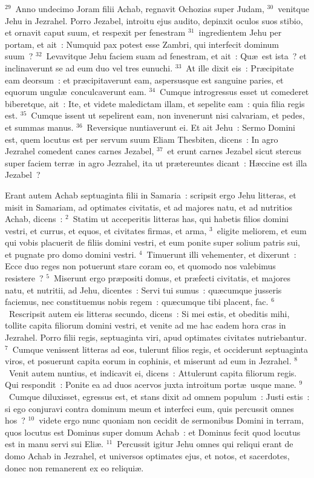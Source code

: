 ${}^{29}$~Anno undecimo Joram filii Achab, regnavit Ochozias super Judam,
${}^{30}$~venitque Jehu in Jezrahel. Porro Jezabel, introitu ejus audito, depinxit oculos suos stibio, et ornavit caput suum, et respexit per fenestram
${}^{31}$~ingredientem Jehu per portam, et ait~: Numquid pax potest esse Zambri, qui interfecit dominum suum~?
${}^{32}$~Levavitque Jehu faciem suam ad fenestram, et ait~: Qu\ae\ est ista~? et inclinaverunt se ad eum duo vel tres eunuchi.
${}^{33}$~At ille dixit eis~: Pr\ae cipitate eam deorsum~: et pr\ae cipitaverunt eam, aspersusque est sanguine paries, et equorum ungul\ae\ conculcaverunt eam.
${}^{34}$~Cumque introgressus esset ut comederet biberetque, ait~: Ite, et videte maledictam illam, et sepelite eam~: quia filia regis est.
${}^{35}$~Cumque issent ut sepelirent eam, non invenerunt nisi calvariam, et pedes, et summas manus.
${}^{36}$~Reversique nuntiaverunt ei. Et ait Jehu~: Sermo Domini est, quem locutus est per servum suum Eliam Thesbiten, dicens~: In agro Jezrahel comedent canes carnes Jezabel,
${}^{37}$~et erunt carnes Jezabel sicut stercus super faciem terr\ae\ in agro Jezrahel, ita ut pr\ae tereuntes dicant~: H\ae ccine est illa Jezabel~?

\bchapter
\lettrine[lines=3,image=true,loversize=0.05,lraise=-0.03]{E}{}rant autem Achab septuaginta filii in Samaria~: scripsit ergo Jehu litteras, et misit in Samariam, ad optimates civitatis, et ad majores natu, et ad nutritios Achab, dicens~:
${}^{2}$~Statim ut acceperitis litteras has, qui habetis filios domini vestri, et currus, et equos, et civitates firmas, et arma,
${}^{3}$~eligite meliorem, et eum qui vobis placuerit de filiis domini vestri, et eum ponite super solium patris sui, et pugnate pro domo domini vestri.
${}^{4}$~Timuerunt illi vehementer, et dixerunt~: Ecce duo reges non potuerunt stare coram eo, et quomodo nos valebimus resistere~?
${}^{5}$~Miserunt ergo pr\ae positi domus, et pr\ae fecti civitatis, et majores natu, et nutritii, ad Jehu, dicentes~: Servi tui sumus~: qu\ae cumque jusseris faciemus, nec constituemus nobis regem~: qu\ae cumque tibi placent, fac.
${}^{6}$~Rescripsit autem eis litteras secundo, dicens~: Si mei estis, et obeditis mihi, tollite capita filiorum domini vestri, et venite ad me hac eadem hora cras in Jezrahel. Porro filii regis, septuaginta viri, apud optimates civitates nutriebantur.
${}^{7}$~Cumque venissent litteras ad eos, tulerunt filios regis, et occiderunt septuaginta viros, et posuerunt capita eorum in cophinis, et miserunt ad eum in Jezrahel.
${}^{8}$~Venit autem nuntius, et indicavit ei, dicens~: Attulerunt capita filiorum regis. Qui respondit~: Ponite ea ad duos acervos juxta introitum port\ae\ usque mane.
${}^{9}$~Cumque diluxisset, egressus est, et stans dixit ad omnem populum~: Justi estis~: si ego conjuravi contra dominum meum et interfeci eum, quis percussit omnes hos~?
${}^{10}$~videte ergo nunc quoniam non cecidit de sermonibus Domini in terram, quos locutus est Dominus super domum Achab~: et Dominus fecit quod locutus est in manu servi sui Eli\ae .
${}^{11}$~Percussit igitur Jehu omnes qui reliqui erant de domo Achab in Jezrahel, et universos optimates ejus, et notos, et sacerdotes, donec non remanerent ex eo reliqui\ae .


